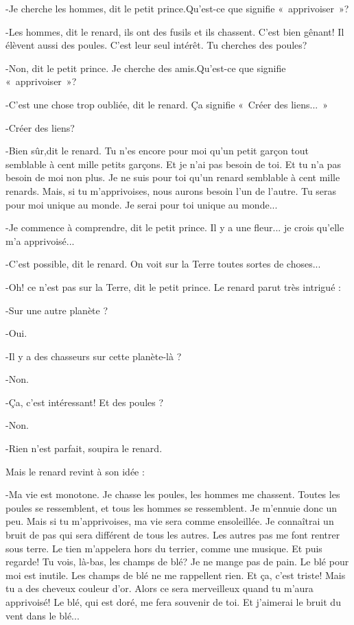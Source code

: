 \documentclass{report}
\begin{document}
-Je cherche les hommes, dit le petit prince.Qu'est-ce que signifie «~apprivoiser~»?

-Les hommes, dit le renard, ils ont des fusils et ils chassent. C'est bien gênant! Il élèvent aussi des poules. C'est leur seul intérêt. Tu cherches des poules?

-Non, dit le petit prince. Je cherche des amis.Qu'est-ce que signifie «~apprivoiser~»?

-C'est une chose trop oubliée, dit le renard. Ça signifie «~Créer des liens...~»

-Créer des liens?

-Bien sûr,dit le renard. Tu n'es encore pour moi qu'un petit garçon tout semblable à cent mille petits garçons. Et je n'ai pas besoin de toi. Et tu n'a pas besoin de moi non plus. Je ne suis pour toi qu'un renard semblable à cent mille renards. Mais, si tu m'apprivoises, nous aurons besoin l'un de l'autre. Tu seras pour moi unique au monde. Je serai pour toi unique au monde...

-Je commence à comprendre, dit le petit prince. Il y a une fleur... je crois qu'elle m'a apprivoisé...

-C'est possible, dit le renard. On voit sur la Terre toutes sortes de choses...

-Oh! ce n'est pas sur la Terre, dit le petit prince. Le renard parut très intrigué :

-Sur une autre planète ?

-Oui.

-Il y a des chasseurs sur cette planète-là ?

-Non.

-Ça, c'est intéressant! Et des poules ?

-Non.

-Rien n'est parfait, soupira le renard.

Mais le renard revint à son idée :

-Ma vie est monotone. Je chasse les poules, les hommes me chassent. Toutes les poules se ressemblent, et tous les hommes se ressemblent. Je m'ennuie donc un peu. Mais si tu m'apprivoises, ma vie sera comme ensoleillée. Je connaîtrai un bruit de pas qui sera différent de tous les autres. Les autres pas me font rentrer sous terre. Le tien m'appelera hors du terrier, comme une musique. Et puis regarde! Tu vois, là-bas, les champs de blé? Je ne mange pas de pain. Le blé pour moi est inutile. Les champs de blé ne me rappellent rien. Et ça, c'est triste! Mais tu a des cheveux couleur d'or. Alors ce sera merveilleux quand tu m'aura apprivoisé! Le blé, qui est doré, me fera souvenir de toi. Et j'aimerai le bruit du vent dans le blé...
\end{document}
